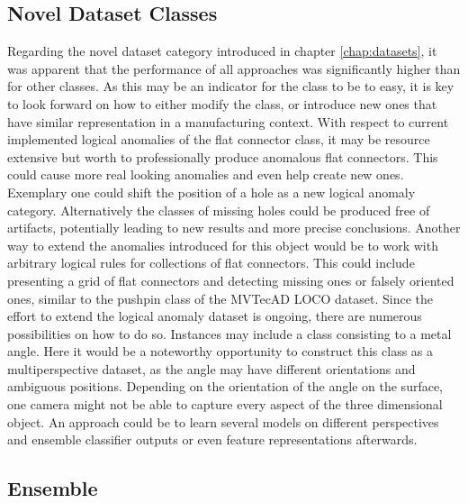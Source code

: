\subsection{Novel Dataset Classes}
Regarding the novel dataset category introduced in chapter \ref{chap:datasets}, it was apparent that the performance of all approaches was significantly higher than for other classes. 
As this may be an indicator for the class to be to easy, it is key to look forward on how to either modify the class, or introduce new ones that have similar representation in a 
manufacturing context. \newline
With respect to current implemented logical anomalies of the flat connector class, it may be resource extensive but worth to professionally produce anomalous flat connectors. This 
could cause more real looking anomalies and even help create new ones. Exemplary one could shift the position of a hole as a new logical anomaly category. Alternatively the classes 
of missing holes could be produced free of artifacts, potentially leading to new results and more precise conclusions. Another way to extend the anomalies introduced for this 
object would be to work with arbitrary logical rules for collections of flat connectors. This could include presenting a grid of flat connectors and detecting missing ones or falsely 
oriented ones, similar to the pushpin class of the MVTecAD LOCO \cite{LOCODentsAndScratchesBergmann2022} dataset.\newline 
Since the effort to extend the logical anomaly dataset is ongoing, there are numerous possibilities on how to do so. Instances may include a class consisting to a metal angle. 
Here it would be a noteworthy opportunity to construct this class as a multiperspective dataset, as the angle may have different orientations and ambiguous positions. Depending 
on the orientation of the angle on the surface, one camera might not be able to capture every aspect of the three dimensional object. An approach could be to learn several models 
on different perspectives and ensemble classifier outputs or even feature representations afterwards.

\subsection{Ensemble}
\label{subsec:ensembleconc}

